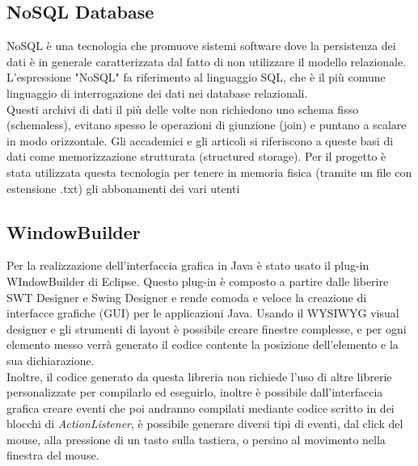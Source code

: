 \subsection{NoSQL Database}
NoSQL è una tecnologia che promuove sistemi software dove la persistenza dei dati è in generale caratterizzata dal fatto di non utilizzare il modello relazionale. L'espressione "NoSQL" fa riferimento al linguaggio SQL, che è il più comune linguaggio di interrogazione dei dati nei database relazionali.
\\Questi archivi di dati il più delle volte non richiedono uno schema fisso (schemaless), evitano spesso le operazioni di giunzione (join) e puntano a scalare in modo orizzontale. Gli accademici e gli articoli si riferiscono a queste basi di dati come memorizzazione strutturata (structured storage). Per il progetto è stata utilizzata questa tecnologia per tenere in memoria fisica (tramite un file con estensione .txt) gli abbonamenti dei vari utenti
\subsection{WindowBuilder}
Per la realizzazione dell'interfaccia grafica in Java è stato usato il plug-in WIndowBuilder di Eclipse. Questo plug-in è composto a partire dalle liberire SWT Designer e Swing Designer e rende comoda e veloce la creazione di interfacce grafiche (GUI) per le applicazioni Java. Usando il WYSIWYG visual designer e gli strumenti di layout è possibile creare finestre complesse, e per ogni elemento messo verrà generato il codice contente la posizione dell'elemento e la sua dichiarazione.
\\Inoltre, il codice generato da questa libreria non richiede l'uso di altre librerie personalizzate per compilarlo ed eseguirlo, inoltre è possibile dall'interfaccia grafica creare eventi che poi andranno compilati mediante codice scritto in dei blocchi di \textit{ActionListener}, è possibile generare diversi tipi di eventi, dal click del mouse, alla pressione di un tasto sulla tastiera, o persino al movimento nella finestra del mouse.

